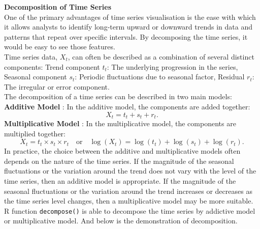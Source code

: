 \documentclass{article}\usepackage[]{graphicx}\usepackage[]{xcolor}
\numberwithin{equation}{section}
\begin{document}
\noindent
\textbf{Decomposition of Time Series}\\
\noindent
One of the primary advantages of time series visualisation is the ease with which it allows analysts to identify long-term upward or downward trends in data and patterns that repeat over specific intervals. By decomposing the time series, it would be easy to see those features.\\

\noindent
Time series data, $X_t$, can often be described as a combination of several distinct components: Trend component $t_t$: The underlying progression in the series, Seasonal component $s_t$: Periodic fluctuations due to seasonal factor, Residual $r_t$: The irregular or error component.\\

\noindent
The decomposition of a time series can be described in two main models:\\
\textbf{Additive Model} \cite{Brockwell2016Introduction}: In the additive model, the components are added together:
\[
X_t = t_t + s_t + r_t.
\]
\textbf{Multiplicative Model} \cite{Brockwell2016Introduction}: In the multiplicative model, the components are multiplied together:
\[
X_t = t_t \times s_t \times r_t \quad \text{or} \quad \log(X_t) = \log(t_t) + \log(s_t) + \log(r_t).
\]
In practice, the choice between the additive and multiplicative models often depends on the nature of the time series. If the magnitude of the seasonal fluctuations or the variation around the trend does not vary with the level of the time series, then an additive model is appropriate. If the magnitude of the seasonal fluctuations or the variation around the trend increases or decreases as the time series level changes, then a multiplicative model may be more suitable.\\

\noindent
R function \texttt{decompose()} is able to decompose the time series by addictive model or multiplicative model. And below is the demonstration of decomposition.
\end{document}
